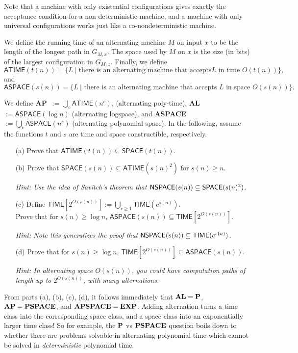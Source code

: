 \documentclass{article}
\newcommand{\TIME}{\mathbf{TIME}}
\def \ATIME{{\mathsf{ATIME}}}
\def \ASPACE{{\mathsf{ASPACE}}}
\def \SPACE{{\mathsf{SPACE}}}
\def \TIME{{\mathsf{TIME}}}
\begin{document}
Note that a machine with only existential configurations gives exactly the acceptance condition for a non-deterministic machine, and a machine with only universal configurations works just like a co-nondeterministic machine.

We define the running time of an alternating machine $M$ on input $x$ to be the length of the longest path in $G_{M,x}$. The space used by $M$ on $x$ is the size (in bits) of the largest configuration in $G_{M,x}$. Finally, we define\[\ATIME(t(n)) = \{L ~| \text{ there is an alternating machine that accepts
$L$ in time $O(t(n))$}\},\] and
\[\ASPACE(s(n)) = \{L ~| \text{ there is an alternating machine that
accepts $L$ in space $O(s(n))$}\}.\]

We define {\bf AP}~$:= \bigcup_c \ATIME(n^c)$, (alternating poly-time), {\bf AL}~$:= \ASPACE(\log n)$ (alternating logspace), and {\bf ASPACE}~$:= \bigcup_c \ASPACE(n^c)$ (alternating polynomial
space). In the following, assume the functions $t$ and $s$ are time and space constructible, respectively.

\begin{enumerate}
\item[(a)] Prove that $\ATIME(t(n)) \subseteq \SPACE(t(n))$.
\item[(b)] Prove that $\SPACE(s(n)) \subseteq \ATIME(s(n)^2)$ for
$s(n)\geq n$.

{\it Hint: Use the idea of Savitch's theorem that ${\sf NSPACE}(s(n)) \subseteq \SPACE(s(n)^2)$.}

\item[(c)] Define $\TIME[2^{O(s(n))}] := {\bigcup_{c \geq 1} \TIME(c^{s(n)})}$.\\
Prove that  for $s(n) \geq \log n$, $\ASPACE(s(n)) \subseteq \TIME[2^{O(s(n))}]$.

{\it Hint: Note this generalizes the proof that ${\sf NSPACE}(s(n))
	\subseteq \TIME(c^{s(n)})$.}

\item[(d)] Prove that for $s(n) \geq \log n$, $\TIME[2^{O(s(n))}] \subseteq \ASPACE(s(n))$.

{\it Hint: In alternating space $O(s(n))$, you could have computation paths of length up to $2^{O(s(n))}$, with many alternations.} 
\end{enumerate}

From parts (a), (b), (c), (d), it follows immediately that $\bf{AL}=\bf{P}$, $\bf{AP}=\bf{PSPACE}$, and $\bf{APSPACE}=\bf{EXP}$. Adding alternation turns a time class into the corresponding space class, and a space class into an exponentially larger time class! So for example, the $\bf{P}$ vs $\bf{PSPACE}$ question boils down to whether there are problems solvable in alternating polynomial time which cannot be solved in \emph{deterministic} polynomial time. 
\end{document}

